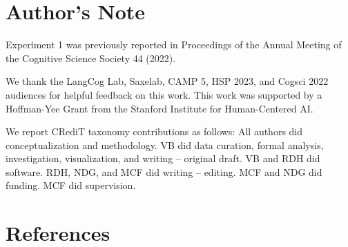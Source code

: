 \documentclass[
  english,
]{article}
\begin{document}
\hypertarget{authors-note}{%
\section{Author's Note}\label{authors-note}}

Experiment 1 was previously reported in Proceedings of the Annual Meeting of the Cognitive Science Society 44 (2022).

We thank the LangCog Lab, Saxelab, CAMP 5, HSP 2023, and Cogsci 2022 audiences for helpful feedback on this work. This work was supported by a Hoffman-Yee Grant from the Stanford Institute for Human-Centered AI.

We report CRediT taxonomy contributions as follows: All authors did conceptualization and methodology. VB did data curation, formal analysis, investigation, visualization, and writing -- original draft. VB and RDH did software. RDH, NDG, and MCF did writing -- editing. MCF and NDG did funding. MCF did supervision.

\hypertarget{references}{%
\section{References}\label{references}}

\setlength{\parindent}{-0.1in} 
\setlength{\leftskip}{0.125in}

\noindent
\end{document}
